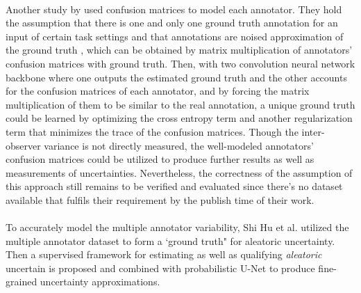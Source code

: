 \documentclass[12pt]{extarticle}
\begin{document}
\paragraph{}
Another study by \cite{zhang2020disentangling} used confusion matrices to
model each annotator. They hold the assumption that there is one and
only one ground truth annotation for an input of certain task settings and
that annotations are noised approximation of the ground truth
, which can be obtained by matrix multiplication of annotators' 
confusion matrices with ground truth. Then, with two convolution neural network backbone
where one outputs the estimated ground truth and the other accounts for the confusion matrices
of each annotator, and by forcing the matrix multiplication of them to be similar to the
real annotation, a unique ground truth could be learned by optimizing the cross entropy term
and another regularization term that minimizes the trace of the confusion matrices.
Though the inter-observer variance is not directly measured, the well-modeled annotators'
confusion matrices could be utilized to produce further results
as well as measurements of uncertainties.
Nevertheless, the correctness of the assumption of this approach
still remains to be verified and evaluated since there's no dataset available 
that fulfils their requirement by the publish time of their work.
\paragraph{}
To accurately model the multiple annotator variability, Shi Hu et al.\cite{hu2019supervised} utilized the multiple annotator dataset
to form a `ground truth" for aleatoric uncertainty. Then a supervised framework for estimating
as well as qualifying \textit{aleatoric} uncertain is proposed and combined with probabilistic U-Net
to produce fine-grained uncertainty approximations. 
\end{document}
